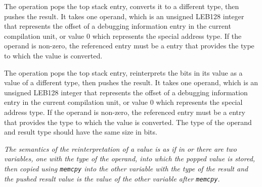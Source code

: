 \begin{enumerate}[1. ]
\itembfnl{\DWOPconvertTARG}
The \DWOPconvertNAME{} operation pops the top stack entry, converts it to a
different type, then pushes the result. It takes one operand, which is an
unsigned LEB128 integer that represents the offset of a debugging
information entry in the current compilation unit, or value 0 which
represents the special address type. If the operand is non-zero, the
referenced entry must be a \DWTAGbasetype{} entry that provides the type
to which the value is converted.

\itembfnl{\DWOPreinterpretTARG}
The \DWOPreinterpretNAME{} operation pops the top stack entry, reinterprets
the bits in its value as a value of a different type, then pushes the
result. It takes one operand, which is an unsigned LEB128 integer that
represents the offset of a debugging information entry in the current
compilation unit, or value 0 which represents the special address type.
If the operand is non-zero, the referenced entry must be a
\DWTAGbasetype{} entry that provides the type to which the value is converted.
The type of the operand and result type should have the same size in bits.

\textit{The semantics of the reinterpretation of a value is as if in 
 or 
there are two variables, one with the type of the operand, into which
the popped value is stored, then copied using \texttt{memcpy} into the other variable
with the type of the result and the pushed result value is the value of the
other variable after \texttt{memcpy}.}

\end{enumerate}

